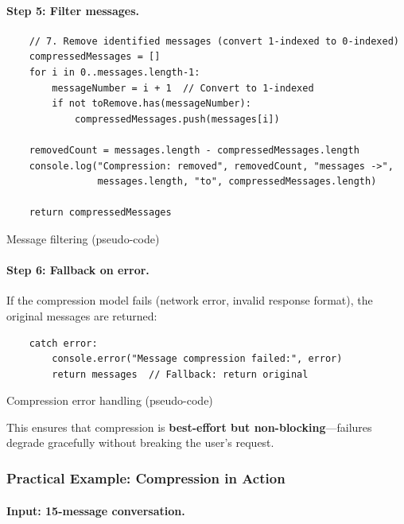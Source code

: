 \documentclass[english]{article}
\begin{document}
\paragraph{Step 5: Filter messages.}

\begin{listing}[H]
\begin{verbatim}
    // 7. Remove identified messages (convert 1-indexed to 0-indexed)
    compressedMessages = []
    for i in 0..messages.length-1:
        messageNumber = i + 1  // Convert to 1-indexed
        if not toRemove.has(messageNumber):
            compressedMessages.push(messages[i])

    removedCount = messages.length - compressedMessages.length
    console.log("Compression: removed", removedCount, "messages ->",
                messages.length, "to", compressedMessages.length)

    return compressedMessages
\end{verbatim}
\caption{Message filtering (pseudo-code)}
\end{listing}

\paragraph{Step 6: Fallback on error.}

If the compression model fails (network error, invalid response format), the original messages are returned:

\begin{listing}[H]
\begin{verbatim}
    catch error:
        console.error("Message compression failed:", error)
        return messages  // Fallback: return original
\end{verbatim}
\caption{Compression error handling (pseudo-code)}
\end{listing}

This ensures that compression is \textbf{best-effort but non-blocking}—failures degrade gracefully without breaking the user's request.

\subsubsection{Practical Example: Compression in Action}

\paragraph{Input: 15-message conversation.}
\end{document}
